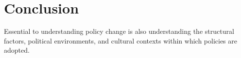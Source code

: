 \chapter{Conclusion}
 
 Essential to understanding policy change is also understanding the structural factors, political environments, and cultural contexts within which policies are adopted.  
 
 
 
